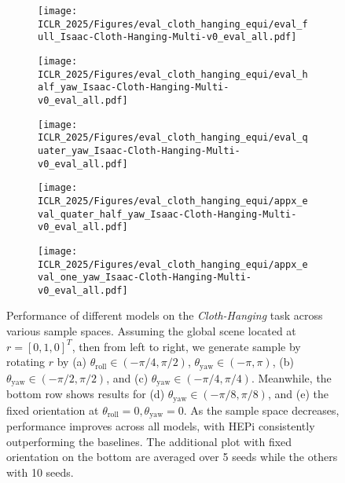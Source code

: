 \begin{figure*}[t]
    \makebox[\textwidth][c]{
    
    }
    \centering
    \begin{subfigure}[b]{0.32\linewidth}
        \texttt{[image: ICLR\_2025/Figures/eval\_cloth\_hanging\_equi/eval\_full\_Isaac-Cloth-Hanging-Multi-v0\_eval\_all.pdf]}
        \caption{}
    \end{subfigure}
    \hfill
    \begin{subfigure}[b]{0.32\linewidth}
        \texttt{[image: ICLR\_2025/Figures/eval\_cloth\_hanging\_equi/eval\_half\_yaw\_Isaac-Cloth-Hanging-Multi-v0\_eval\_all.pdf]}
        \caption{}
    \end{subfigure}
    \hfill
    \begin{subfigure}[b]{0.32\linewidth}
        \texttt{[image: ICLR\_2025/Figures/eval\_cloth\_hanging\_equi/eval\_quater\_yaw\_Isaac-Cloth-Hanging-Multi-v0\_eval\_all.pdf]}
        \caption{}
    \end{subfigure}
    
    \medskip
    \begin{minipage}{0.65\textwidth}
    \centering
    \begin{subfigure}[b]{0.49\linewidth}
        \texttt{[image: ICLR\_2025/Figures/eval\_cloth\_hanging\_equi/appx\_eval\_quater\_half\_yaw\_Isaac-Cloth-Hanging-Multi-v0\_eval\_all.pdf]}
        \caption{}
    \end{subfigure}
    \hfill
    \begin{subfigure}[b]{0.49\linewidth}
        \texttt{[image: ICLR\_2025/Figures/eval\_cloth\_hanging\_equi/appx\_eval\_one\_yaw\_Isaac-Cloth-Hanging-Multi-v0\_eval\_all.pdf]}
        \caption{}
    \end{subfigure}
    \end{minipage}
    \caption{Performance of different models on the \emph{Cloth-Hanging} task across various sample spaces. Assuming the global scene located at $r=[0,1,0]^T$, then from left to right, we generate sample by rotating $r$ by (a) $\theta_{\text{roll}} \in (-\pi/4, \pi/2)$, $\theta_{\text{yaw}} \in (-\pi, \pi)$, (b) $\theta_{\text{yaw}} \in (-\pi/2, \pi/2)$, and (c) $\theta_{\text{yaw}} \in (-\pi/4, \pi/4)$. Meanwhile, the bottom row shows results for (d) $\theta_{\text{yaw}}\in (-\pi/8, \pi/8)$, and (e) the fixed orientation at $\theta_{\text{roll}}=0, \theta_{\text{yaw}}=0$. As the sample space decreases, performance improves across all models, with HEPi consistently outperforming the baselines. The additional plot with fixed orientation on the bottom are averaged over 5 seeds while the others with 10 seeds.}
    \vspace{-0.2cm}
    \label{fig:appx_eval_equi}
\end{figure*}
